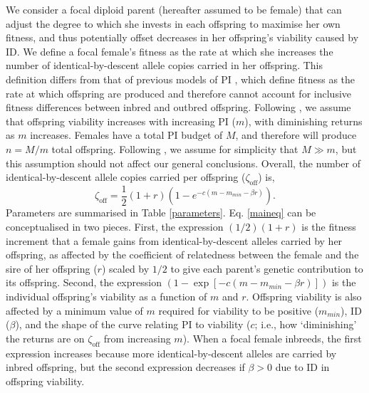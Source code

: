 \documentclass[12pt]{article}
\begin{document}
We consider a focal diploid parent (hereafter assumed to be female) that can adjust the degree to which she invests in each offspring to maximise her own fitness, and thus potentially offset decreases in her offspring's viability caused by ID. We define a focal female's fitness as the rate at which she increases the number of identical-by-descent allele copies carried in her offspring. This definition differs from that of previous models of PI \cite[e.g.,][]{Macnair1978, Parker1978}, which define fitness as the rate at which offspring are produced and therefore cannot account for inclusive fitness differences between inbred and outbred offspring. Following \cite{Parker1978}, we assume that offspring viability increases with increasing PI ($m$), with diminishing returns as $m$ increases. Females have a total PI budget of $M$, and therefore will produce $n=M/m$ total offspring. Following \cite{Parker1985}, we assume for simplicity that $M \gg m$, but this assumption should not affect our general conclusions. Overall, the number of identical-by-descent allele copies carried per offspring ($\zeta_{\textrm{off}}$) is,
\begin{equation} \label{maineq}
\zeta_{\textrm{off}} = \frac{1}{2}\left(1+r\right)\left(1-e^{-c\left(m-m_{min}-\beta r\right)}\right).
\end{equation}
Parameters are summarised in Table \ref{parameters}. Eq. \ref{maineq} can be conceptualised in two pieces. First, the expression $\left(1/2\right) \left(1 + r\right)$ is the fitness increment that a female gains from identical-by-descent alleles carried by her offspring, as affected by the coefficient of relatedness between the female and the sire of her offspring ($r$) scaled by $1/2$ to give each parent's genetic contribution to its offspring. Second, the expression $\left(1 - \exp\left[-c\left(m-m_{min}-\beta r\right)\right]\right)$ is the individual offspring's viability as a function of $m$ and $r$. Offspring viability is also affected by a minimum value of $m$ required for viability to be positive ($m_{min}$), ID ($\beta$), and the shape of the curve relating PI to viability ($c$; i.e., how `diminishing' the returns are on $\zeta_{\textrm{off}}$ from increasing $m$). When a focal female inbreeds, the first expression increases because more identical-by-descent alleles are carried by inbred offspring, but the second expression decreases if $\beta>0$ due to ID in offspring viability.
\end{document}
